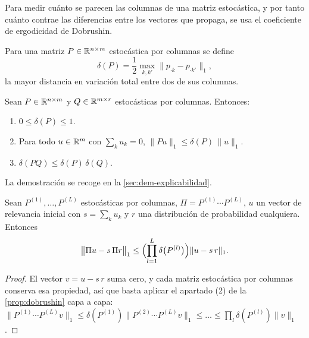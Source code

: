 Para medir cuánto se parecen las columnas de una matriz estocástica, y por tanto cuánto contrae las diferencias entre los vectores que propaga, se usa el coeficiente de ergodicidad de Dobrushin.

\begin{definicion}\label{def:dobrushin}
Para una matriz $P \in \mathbb{R}^{n \times m}$ estocástica por columnas se define
\[
  \delta(P) = \frac12 \max_{k, k'} \bigl\lVert p_{\cdot k} - p_{\cdot k'} \bigr\rVert_1 ,
\]
la mayor distancia en variación total entre dos de sus columnas.
\end{definicion}

\begin{proposicion}\label{prop:dobrushin}
Sean $P \in \mathbb{R}^{n \times m}$ y $Q \in \mathbb{R}^{m \times r}$ estocásticas por columnas. Entonces:
\begin{enumerate}
  \item $0 \leq \delta(P) \leq 1$.
  \item Para todo $u \in \mathbb{R}^{m}$ con $\sum_{k} u_k = 0$, $\lVert P u \rVert_1 \leq \delta(P)\, \lVert u \rVert_1$.
  \item $\delta(PQ) \leq \delta(P)\, \delta(Q)$.
\end{enumerate}
\end{proposicion}

La demostración se recoge en la \cref{sec:dem-explicabilidad}.

\begin{corolario}\label{cor:olvido}
Sean $P^{(1)}, \dots, P^{(L)}$ estocásticas por columnas, $\Pi = P^{(1)} \cdots P^{(L)}$, $u$ un vector de relevancia inicial con $s = \sum_k u_k$ y $r$ una distribución de probabilidad cualquiera. Entonces
\[
  \bigl\lVert \Pi u - s\, \Pi r \bigr\rVert_1 \leq \Bigl( \prod_{l=1}^{L} \delta\bigl(P^{(l)}\bigr) \Bigr) \lVert u - s\, r \rVert_1 .
\]
\end{corolario}

\begin{proof}
El vector $v = u - s\,r$ suma cero, y cada matriz estocástica por columnas conserva esa propiedad, así que basta aplicar el apartado (2) de la \cref{prop:dobrushin} capa a capa: $\lVert P^{(1)} \cdots P^{(L)} v \rVert_1 \leq \delta(P^{(1)}) \lVert P^{(2)} \cdots P^{(L)} v \rVert_1 \leq \dots \leq \prod_{l} \delta(P^{(l)}) \lVert v \rVert_1$.
\end{proof}

